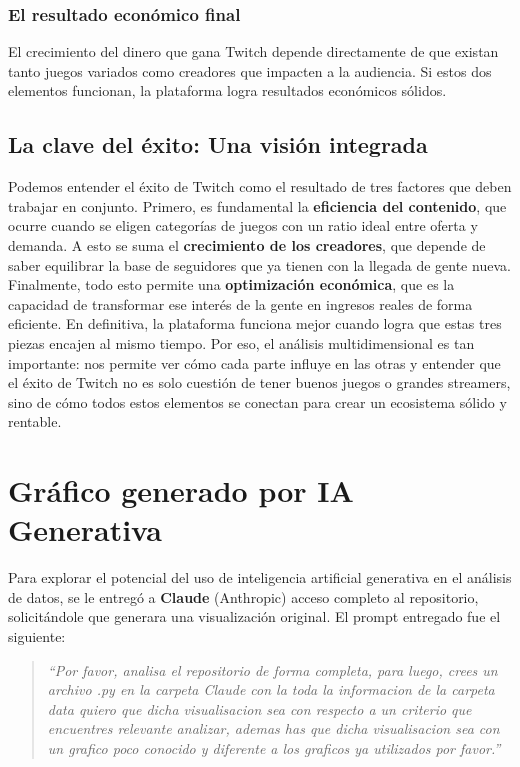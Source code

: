 \documentclass[12pt,a4paper]{article}
\begin{document}
\subsubsection{El resultado económico final} 
El crecimiento del dinero que gana Twitch depende directamente de que existan tanto juegos variados como creadores que impacten a la audiencia. Si estos dos elementos funcionan, la plataforma logra resultados económicos sólidos.

\subsection{La clave del éxito: Una visión integrada} 

Podemos entender el éxito de Twitch como el resultado de tres factores que deben trabajar en conjunto. Primero, es fundamental la \textbf{eficiencia del contenido}, que ocurre cuando se eligen categorías de juegos con un ratio ideal entre oferta y demanda. A esto se suma el \textbf{crecimiento de los creadores}, que depende de saber equilibrar la base de seguidores que ya tienen con la llegada de gente nueva. Finalmente, todo esto permite una \textbf{optimización económica}, que es la capacidad de transformar ese interés de la gente en ingresos reales de forma eficiente. En definitiva, la plataforma funciona mejor cuando logra que estas tres piezas encajen al mismo tiempo. Por eso, el análisis multidimensional es tan importante: nos permite ver cómo cada parte influye en las otras y entender que el éxito de Twitch no es solo cuestión de tener buenos juegos o grandes streamers, sino de cómo todos estos elementos se conectan para crear un ecosistema sólido y rentable.

\newpage
\section{Gráfico generado por IA Generativa}

Para explorar el potencial del uso de inteligencia artificial generativa en el análisis de datos, se le entregó a \textbf{Claude} (Anthropic) acceso completo al repositorio, solicitándole que generara una visualización original. El prompt entregado fue el siguiente:

\begin{quote}
\textit{``Por favor, analisa el repositorio de forma completa, para luego, crees un archivo .py en la carpeta Claude con la toda la informacion de la carpeta data quiero que dicha visualisacion sea con respecto a un criterio que encuentres relevante analizar, ademas has que dicha visualisacion sea con un grafico poco conocido y diferente a los graficos ya utilizados por favor.''}
\end{quote}
\end{document}
